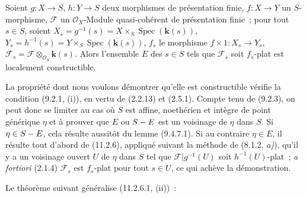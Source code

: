 \begin{proposition}[11.2.8]
\label{IV.11.2.8-fr}
Soient $g:X\to S$, $h:Y\to S$ deux morphismes de présentation finie,
$f:X\to Y$ un $S$-morphisme, $\mathcal F$ un
$\mathcal O_X$-Module quasi-cohérent de présentation finie~; pour tout
$s\in S$, soient $X_s=g^{-1}(s)=X\times_S\operatorname{Spec}(\boldsymbol{k}(s))$,
$Y_s=h^{-1}(s)=Y\times_S\operatorname{Spec}(\boldsymbol{k}(s))$, $f_s$ le morphisme
$f\times1:X_s\to Y_s$, $\mathcal F_s=\mathcal F\otimes_{\mathcal O_S}\boldsymbol{k}(s)$.
Alors l'ensemble $E$ des $s\in S$ tels que $\mathcal F_s$ soit $f_s$-plat
est localement constructible.
\end{proposition}

La propriété dont nous voulons démontrer qu'elle est constructible vérifie la
condition (9.2.1, (i)), en vertu de (2.2.13) et (2.5.1). Compte tenu de
(9.2.3), on peut donc se limiter au cas où $S$ est affine, noethérien et
intègre de point générique $\eta$ et à prouver que $E$ ou $S- E$ est un
voisinage de $\eta$ dans $S$. Si $\eta\in S- E$, cela résulte aussitôt du
lemme (9.4.7.1). Si au contraire $\eta\in E$, il résulte tout d'abord de
(11.2.6), appliqué suivant la méthode de (8.1.2, \emph{a)}), qu'il y a un voisinage
ouvert $U$ de $\eta$ dans $S$ tel que
$\mathcal F|g^{-1}(U)$ soit $h^{-1}(U)$-plat~; \emph{a fortiori} (2.1.4)
$\mathcal F_s$ est $f_s$-plat pour tout $s\in U$, ce qui achève la
démonstration.

Le théorème suivant généralise (11.2.6.1, (ii))~:

